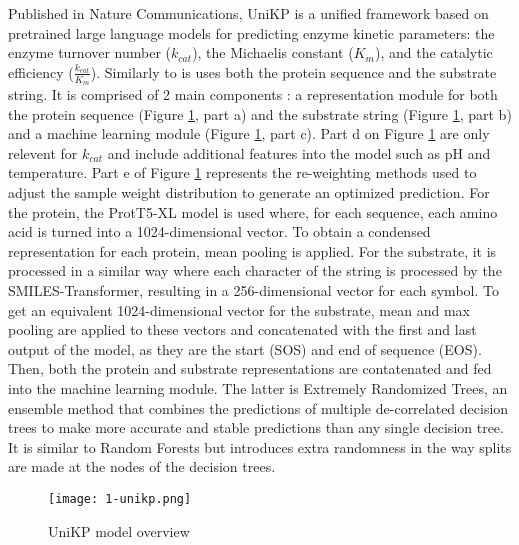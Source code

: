 Published in Nature Communications, UniKP is a unified framework based on pretrained large language models
for predicting enzyme kinetic parameters: the enzyme turnover number ($k_{cat}$), the Michaelis constant
($K_m$), and the catalytic efficiency ($\frac{k_{cat}}{K_m}$). Similarly to \citeauthor{km1} is uses both the
protein sequence and the substrate string. It is comprised of 2 main components : a representation module 
for both the protein sequence (Figure \ref{fig:unikp}, part a) and the substrate string 
(Figure \ref{fig:unikp}, part b) and a machine learning module (Figure \ref{fig:unikp}, part c). 
Part d on Figure \ref{fig:unikp} are only relevent for $k_{cat}$ and include additional features into the model
such as pH and temperature. Part e of Figure \ref{fig:unikp} represents the re-weighting methods used 
to adjust the sample weight distribution to generate an optimized prediction. For the protein, the ProtT5-XL
model is used where, for each sequence, each amino acid is turned into a 1024-dimensional vector. To obtain
a condensed representation for each protein, mean pooling is applied. For the substrate, it is processed in
a similar way where each character of the string is processed by the SMILES-Transformer, resulting in a 
256-dimensional vector for each symbol. To get an equivalent 1024-dimensional vector for the substrate,
mean and max pooling are applied to these vectors and concatenated with the first and last output of the
model, as they are the start (SOS) and end of sequence (EOS). Then, both the protein and substrate representations
are contatenated and fed into the machine learning module. The latter is Extremely Randomized Trees, an
ensemble method that combines the predictions of multiple de-correlated decision trees to make more 
accurate and stable predictions than any single decision tree. It is similar to Random Forests but 
introduces extra randomness in the way splits are made at the nodes of the decision trees. \cite{extratrees}

\begin{figure}
  \centering
  \texttt{[image: 1-unikp.png]}
  \caption{UniKP model overview}
  \label{fig:unikp}
\end{figure}

